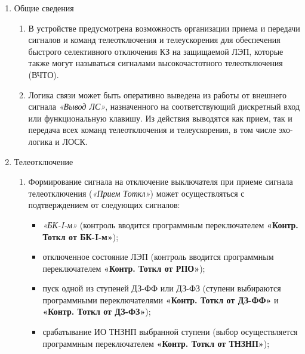
\color{black}

\begin{enumerate}[label=\arabic{section}.\arabic{subsection}.\arabic{enumi}, labelsep=4pt, leftmargin=0pt, itemindent=57pt, itemsep=0pt, parsep=5pt] %

\item Общие сведения
\begin{enumerate}[label=\arabic{section}.\arabic{subsection}.\arabic{enumi}.\arabic*, labelsep=4pt, leftmargin=0em, itemindent=65pt, parsep=0pt]

\item
В устройстве предусмотрена возможность организации приема и передачи сигналов и команд телеотключения и телеускорения для обеспечения быстрого селективного отключения КЗ на защищаемой ЛЭП, которые также могут называться сигналами высокочастотного телеотключения (ВЧТО).

\item
Логика связи может быть оперативно выведена из работы от внешнего сигнала \textit{«Вывод ЛС»}, назначенного на соответствующий дискретный вход или функциональную клавишу. Из действия выводятся как прием, так и передача всех команд телеотключения и телеускорения, в том числе эхо-логика и ЛОСК.

\end{enumerate}

\item Телеотключение
\begin{enumerate}[label=\arabic{section}.\arabic{subsection}.\arabic{enumi}.\arabic*, labelsep=4pt, leftmargin=0em, itemindent=65pt, parsep=0pt]

\item
Формирование сигнала на отключение выключателя при приеме сигнала телеотключения (\textit{«Прием Тоткл»}) может осуществляться с подтверждением от следующих сигналов:

\begin{itemize}
\item \textit{«БК-I-м»} (контроль вводится программным переключателем \textbf{«Контр. Тоткл от БК-I-м»});
\item отключенное состояние ЛЭП (контроль вводится программным переключателем \textbf{«Контр. Тоткл от РПО»});
\item пуск одной из ступеней ДЗ-ФФ или ДЗ-ФЗ (ступени выбираются программными переключателями \textbf{«Контр. Тоткл от ДЗ-ФФ»} и \textbf{«Контр. Тоткл от ДЗ-ФЗ»});
\item срабатывание ИО ТНЗНП выбранной ступени (выбор осуществляется программным переключателем \textbf{«Контр. Тоткл от ТНЗНП»});
\end{itemize}


\end{enumerate}
\end{enumerate}
